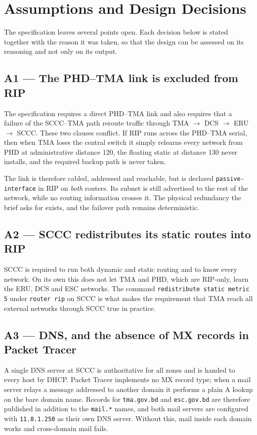 \documentclass[11pt,a4paper]{article}
\newcommand{\netc}[1]{\texttt{\small #1}}
\begin{document}
\setcounter{page}{1}
\tableofcontents
\clearpage
\listoftables
\clearpage
{}
\setcounter{page}{1}


\section{Assumptions and Design Decisions}
\label{sec:assumptions}

The specification leaves several points open. Each decision below is stated
together with the reason it was taken, so that the design can be assessed on
its reasoning and not only on its output.

\subsection{A1 --- The PHD--TMA link is excluded from RIP}
The specification requires a direct PHD--TMA link and also requires that a failure of the SCCC--TMA path reroute traffic through
TMA $\rightarrow$ DCS $\rightarrow$ ERU $\rightarrow$ SCCC. These two clauses conflict. If RIP runs across the PHD--TMA serial, then when TMA loses the central switch it simply relearns every network from PHD at administrative distance 120, the floating static at distance 130 never installs, and the required backup path is never taken.

The link is therefore cabled, addressed and reachable, but is declared
\netc{passive-interface} in RIP on \emph{both} routers. Its subnet is still advertised to the rest of the network, while no routing information crosses it. The physical redundancy the brief asks for exists, and the failover path remains deterministic.

\subsection{A2 --- SCCC redistributes its static routes into RIP}
SCCC is required to run both dynamic and static routing and to know every network. On its own this does not let TMA and PHD, which are RIP-only, learn the ERU, DCS and ESC networks. The command \netc{redistribute static metric 5} under \netc{router rip} on SCCC is what makes the requirement that TMA reach all external networks through SCCC true in practice.

\subsection{A3 --- DNS, and the absence of MX records in Packet Tracer}
A single DNS server at SCCC is authoritative for all zones and is handed to every host by DHCP. Packet Tracer implements no MX record type; when a mail server relays a message addressed to another domain it performs a plain A lookup on the bare domain name. Records for \netc{tma.gov.bd} and \netc{esc.gov.bd} are therefore published in addition to the \netc{mail.*} names, and both mail servers are configured with \netc{11.8.1.250} as their own DNS server. Without this, mail inside each domain works and cross-domain mail fails.
\end{document}

